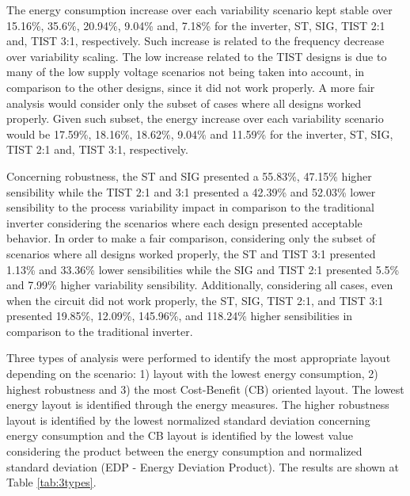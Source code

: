 \documentclass[pgmicro,mestrado,english]{iiufrgs}
\begin{document}
    The energy consumption increase over each variability scenario kept stable over 15.16\%, 35.6\%, 20.94\%, 9.04\% and, 7.18\% for the inverter, ST, SIG, TIST 2:1 and, TIST 3:1, respectively. Such increase is related to the frequency decrease over variability scaling. The low increase related to the TIST designs is due to many of the low supply voltage scenarios not being taken into account, in comparison to the other designs, since it did not work properly. A more fair analysis would consider only the subset of cases where all designs worked properly. Given such subset, the energy increase over each variability scenario would be 17.59\%, 18.16\%, 18.62\%, 9.04\% and 11.59\% for the inverter, ST, SIG, TIST 2:1 and, TIST 3:1, respectively.



    Concerning robustness, the ST and SIG presented a 55.83\%, 47.15\% higher sensibility while the TIST 2:1 and 3:1 presented a 42.39\% and 52.03\% lower sensibility to the process variability impact in comparison to the traditional inverter considering the scenarios where each design presented acceptable behavior. In order to make a fair comparison, considering only the subset of scenarios where all designs worked properly, the ST and TIST 3:1 presented 1.13\% and 33.36\% lower sensibilities while the SIG and TIST 2:1 presented 5.5\% and 7.99\% higher variability sensibility. Additionally, considering all cases, even when the circuit did not work properly, the ST, SIG, TIST 2:1, and TIST 3:1 presented 19.85\%, 12.09\%, 145.96\%, and 118.24\% higher sensibilities in comparison to the traditional inverter.




    Three types of analysis were performed to identify the most appropriate layout depending on the scenario: 1) layout with the lowest energy consumption, 2) highest robustness and 3) the most Cost-Benefit (CB) oriented layout. The lowest energy layout is identified through the energy measures. The higher robustness layout is identified by the lowest normalized standard deviation concerning energy consumption and the CB layout is identified by the lowest value considering the product between the energy consumption and normalized standard deviation (EDP - Energy Deviation Product). The results are shown at Table \ref{tab:3types}.
\end{document}
